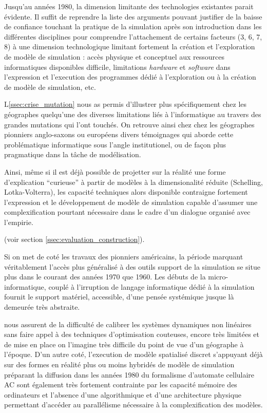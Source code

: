Jusqu'au années 1980, la dimension limitante des technologies existantes parait évidente. Il suffit de reprendre la liste des arguments pouvant justifier de la baisse de confiance touchant la pratique de la simulation après son introduction dans les différentes disciplines pour comprendre l'attachement de certains facteurs (3, 6, 7, 8) à une dimension technologique limitant fortement la création et l'exploration de modèle de simulation : accès physique et conceptuel aux ressources informatiques disponibles difficile, limitations \textit{hardware} et \textit{software} dans l'expression et l'execution des programmes dédié à l'exploration ou à la création de modèle de simulation, etc.

L\ref{ssec:crise_mutation} nous as permis d'illustrer plus spécifiquement chez les géographes quelqu'une des diverses limitations liés à l'informatique au travers des grandes mutations qui l'ont touchés. On retrouve ainsi chez chez les géographes pionniers anglo-saxons ou européens \autocites[155]{Batty1976}{Openshaw1996}{Pumain, Amoral} divers témoignages qui aborde cette problématique informatique sous l'angle institutionel, ou de façon plus pragmatique dans la tâche de modélisation. 

Ainsi, même si il est déjà possible de projetter sur la réalité une forme d'explication \enquote{curieuse} à partir de modèles à la dimensionalité réduite (Schelling, Lotka-Volterra), les capacité techniques alors disponible contraigne fortement l'expression et le développement de modèle de simulation capable d'assumer une complexification pourtant nécessaire dans le cadre d'un dialogue organisé avec l'empirie. 

 (voir section \ref{ssec:evaluation_construction}).

Si on met de coté les travaux des pionniers américains, la période marquant véritablement l'accès plus généralisé à des outils support de la simulation se situe plus dans le courant des années 1970 que 1960. Les débuts de la micro-informatique, couplé à l'irruption de langage informatique dédié à la simulation fournit le support matériel, accessible, d'une pensée systémique jusque là demeurée très abstraite. 

nous assurent de la difficulté de calibrer les systèmes dynamiques non linéaires sans faire appel à des techniques d'optimisation couteuses, encore très limitées et de mise en place on l'imagine très difficile du point de vue d'un géographe à l'époque. D'un autre coté, l'execution de modèle spatialisé discret s'appuyant déjà sur des formes en réalité plus ou moins hybridés  de modèle de simulation  préparant \autocites{Hagerstrand1957, Morril1962, Tobler1970, Allen1978, Wilson?} la diffusion dans les années 1980 du formalisme d'automate cellulaire AC \autocites{Tobler1979, Couclelis1985} \autocite[32-38]{Louail2010} sont également très fortement contrainte par les capacité mémoire des ordinateurs \autocite{Marble1972} et l'absence d'une algorithmique et d'une architecture physique permettant d'accéder au parallélisme nécessaire à la complexification des modèles.

